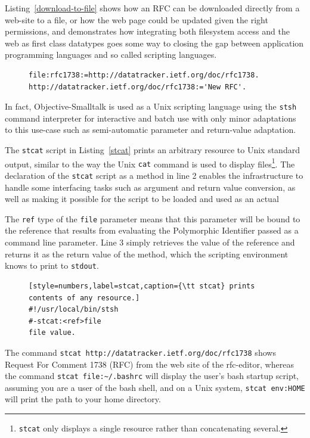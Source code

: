 \documentclass{acm_proc_article-sp}
\begin{document}
Listing~\ref{download-to-file} shows how an RFC can be downloaded directly from a web-site
to a file, or how the web page could be updated given the right permissions, and demonstrates how integrating both filesystem access and the web as first class datatypes
goes some way to closing the gap between application programming languages and so called
scripting languages.

\begin{figure}[htbp]
\begin{lstlisting}[style=numbers,label=download-to-file,caption=Downloading an RFC to a file.]
file:rfc1738:=http://datatracker.ietf.org/doc/rfc1738.
http://datatracker.ietf.org/doc/rfc1738:='New RFC'.
\end{lstlisting}
\end{figure}

In fact,  Objective-Smalltalk is used as a Unix scripting language using the {\tt stsh} command
interpreter for interactive and batch use with only minor adaptations to this use-case such
as semi-automatic parameter and return-value adaptation.


The {\tt stcat} script in Listing~\ref{stcat} prints an arbitrary resource to Unix standard output, 
similar to the way the Unix {\tt cat} command is used to display files\footnote{{\tt stcat} only 
displays a single resource rather than concatenating several.}.
The declaration of the {\tt stcat} script as a method in line 2 enables the infrastructure to 
handle some interfacing tasks such as argument and return value conversion, as well
as making it possible for the script to be loaded and used as an actual 

The {\tt ref} type of the {\tt file} parameter means that this parameter will be bound to the
reference that results from evaluating the Polymorphic Identifier passed as a command
line parameter.    Line 3 simply retrieves the value of the reference and returns it as
the return value of the method, which the scripting environment knows to print to {\tt stdout}.


\begin{figure}[htbp]
\begin{lstlisting}[style=numbers,label=stcat,caption={\tt stcat} prints contents of any resource.]
#!/usr/local/bin/stsh
#-stcat:<ref>file
file value.
\end{lstlisting}
\end{figure}


The command  {\tt stcat http://datatracker.ietf.org/doc/rfc1738} shows \break \mbox{Request}
For Comment 1738 (RFC) from the web site of the rfc-editor, whereas 
the command {\tt stcat file:\~\//.bashrc} will display the user's bash startup script, assuming you are a user of the
bash shell, and on a Unix system, {\tt stcat env:HOME} will print the path to 
your home directory.
\fussy
\end{document}
